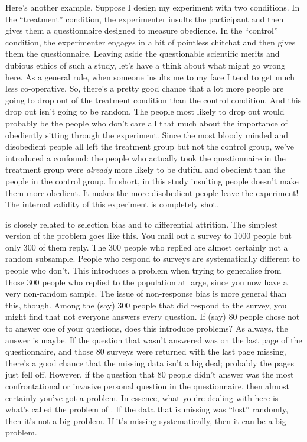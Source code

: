 Here's another example. Suppose I design my experiment with two conditions. In the ``treatment'' condition, the experimenter insults the participant and then gives them a questionnaire designed to measure obedience. In the ``control'' condition, the experimenter engages in a bit of pointless chitchat and then gives them the questionnaire. Leaving aside the questionable scientific merits and dubious ethics of such a study, let's have a think about what might go wrong here. As a general rule, when someone insults me to my face I tend to get much less co-operative. So, there's a pretty good chance that a lot more people are going to drop out of the treatment condition than the control condition. And this drop out isn't going to be random. The people most likely to drop out would probably be the people who don't care all that much about the importance of obediently sitting through the experiment. Since the most bloody minded and disobedient people all left the treatment group but not the control group, we've introduced a confound: the people who actually took the questionnaire in the treatment group were {\it already} more likely to be dutiful and obedient than the people in the control group. In short, in this study insulting people doesn't make them more obedient. It makes the more disobedient people leave the experiment! The internal validity of this experiment is completely shot. 


 is closely related to selection bias and to differential attrition. The simplest version of the problem goes like this. You mail out a survey to 1000 people but only 300 of them reply. The 300 people who replied are almost certainly not a random subsample. People who respond to surveys are systematically different to people who don't. This introduces a problem when trying to generalise from those 300 people who replied to the population at large, since you now have a very non-random sample. The issue of non-response bias is more general than this, though. Among the (say) 300 people that did respond to the survey, you might find that not everyone answers every question. If (say) 80 people chose not to answer one of your questions, does this introduce problems? As always, the answer is maybe. If the question that wasn't answered was on the last page of the questionnaire, and those 80 surveys were returned with the last page missing, there's a good chance that the missing data isn't a big deal; probably the pages just fell off. However, if the question that 80 people didn't answer was the most confrontational or invasive personal question in the questionnaire, then almost certainly you've got a problem. In essence, what you're dealing with here is what's called the problem of . If the data that is missing was ``lost'' randomly, then it's not a big problem. If it's missing systematically, then it can be a big problem.

